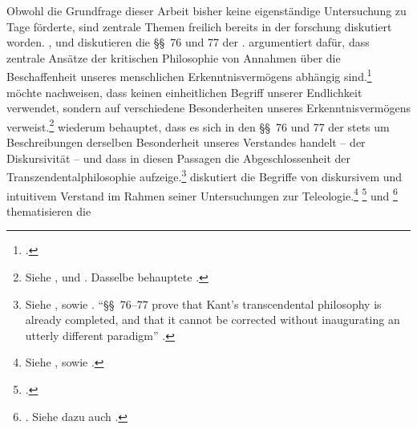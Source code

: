 Obwohl die Grundfrage dieser Arbeit bisher keine eigenständige Untersuchung zu
Tage förderte, sind zentrale Themen freilich bereits in der
forschung diskutiert worden.
,
und  diskutieren die
\S\S~76 und 77 der .
 argumentiert dafür, dass zentrale
Ansätze der kritischen Philosophie von Annahmen über die Beschaffenheit unseres
menschlichen Erkenntnisvermögens abhängig
sind.\footcite[Vgl.][]{Engfer:MenschlicheVernunft2002}
 möchte nachweisen, dass
 keinen einheitlichen Begriff unserer Endlichkeit
verwendet, sondern auf verschiedene Besonderheiten unseres Erkenntnisvermögens
verweist.\footnote{Siehe
\cite{Foerster:DieBedeutungvonSS7677deremphKritikderUrteilskraftfuerdieEntwicklungdernachkantischenPhilosophieTeil12002,Foerster:DieBedeutungvonSS7677deremphKritikderUrteilskraftfuerdieEntwicklungdernachkantischenPhilosophieTeil22002},
und \cite{Foerster:Die25JahrederPhilosophie2011}. Dasselbe behauptete
\textcite[vgl.][153--159]{McLaughlin:KantsKritikderteleologischenUrteilskraft1989}.}
 wiederum behauptet, dass es
sich in den \S\S~76 und 77 der  stets um
Beschreibungen derselben Besonderheit unseres Verstandes handelt -- der
Diskursivität -- und dass  in diesen Passagen die Abgeschlossenheit der
Transzendentalphilosophie aufzeige.\footnote{Siehe
\cite{Nuzzo:KritikderUrteilskraftSS76--772009}, sowie
\cite[][348--353]{Nuzzo:KantandtheUnityofReason2005}. \enquote{\S\S~76--77 prove that Kant's transcendental philosophy
is already completed, and that it cannot be corrected without inaugurating an
utterly different paradigm}
\parencite[][146]{Nuzzo:KritikderUrteilskraftSS76--772009}.}
 diskutiert die
Begriffe von diskursivem und intuitivem Verstand im Rahmen seiner Untersuchungen
zur Teleologie.\footnote{Siehe
\cite[][66--74]{Duesing:DieTeleologieinKantsWeltbegriff1968}, sowie
\cite[][144--147]{Duesing:NaturteleologieundMetaphysikbeiKantundHegel1990}.}
\footcite[Vgl.][]{Quarfood:DiscursivityandTranscendentalIdealism2012}
und
\footnote{\cite[Vgl.][]{Allison:KantsTranscendentalIdealism2004}.
Siehe dazu auch \cite{Pippin:IdealismandFinitude2008}.} thematisieren die
